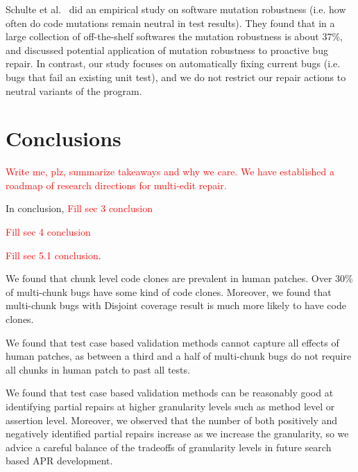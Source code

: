 \documentclass[sigconf, timestamp-false, anonymous=true]{acmart}
\newcommand\todo[1]{\textcolor{red}{#1}}
\begin{document}
Schulte et al.~\cite{schulte} did an empirical study on software mutation robustness 
(i.e. how often do code mutations remain neutral in test results). 
They found that in a large collection of off-the-shelf softwares the mutation robustness is about 37\%, 
and discussed potential application of mutation robustness to proactive bug repair. 
In contrast, our study focuses on automatically fixing current bugs (i.e. bugs that fail an existing unit test), 
and we do not restrict our repair actions to neutral variants of the program.

\section{Conclusions}
\label{sec:conclusions}

\todo{Write me, plz, summarize takeaways and why we care.  We have established a
  roadmap of research directions for multi-edit repair.}

In conclusion, \todo{Fill sec 3 conclusion}

\todo{Fill sec 4 conclusion}

\todo{Fill sec 5.1 conclusion}.

We found that chunk level code clones are prevalent in human patches. Over 30\%
of multi-chunk bugs have some kind of code clones. Moreover, we found that multi-chunk bugs with Disjoint
coverage result is much more likely to have code clones.

We found that test case based validation methods cannot capture all effects of human patches,
as between a third and a half of multi-chunk bugs do not require all chunks in human patch to
past all tests.

We found that test case based validation methods can be reasonably good at identifying partial
repairs at higher granularity levels such as method level or assertion level. Moreover, 
we observed that the number of both positively and negatively identified partial repairs
increase as we increase the granularity, so we advice a careful balance of the tradeoffs of
granularity levels in future search based APR development.



\end{document}
